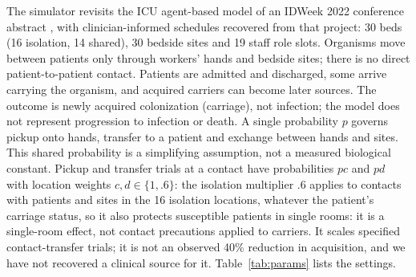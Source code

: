 The simulator revisits the ICU agent-based model of an IDWeek 2022 conference
abstract \citep{baek2022}, with clinician-informed schedules recovered from that
project: 30 beds (16 isolation, 14 shared), 30 bedside sites and 19 staff role
slots. Organisms move between patients only through workers' hands and bedside
sites; there is no direct patient-to-patient contact. Patients are admitted and
discharged, some arrive carrying the organism, and acquired carriers can become
later sources. The outcome is newly acquired colonization (carriage), not
infection; the model does not represent progression to infection or death. A
single probability $p$ governs pickup onto hands, transfer to a patient and
exchange between hands and sites. This shared probability is a simplifying
assumption, not a measured biological constant. Pickup and transfer trials at a
contact have probabilities $pc$ and $pd$ with location weights $c,d\in\{1,.6\}$:
the isolation multiplier .6 applies to contacts with patients and sites in
the 16 isolation locations, whatever the patient's carriage status, so it also
protects susceptible patients in single rooms: it is a single-room effect, not
contact precautions applied to carriers. It scales specified contact-transfer
trials; it is not an observed 40\% reduction in acquisition, and we have not
recovered a clinical source for it. Table~\ref{tab:params} lists the settings.

